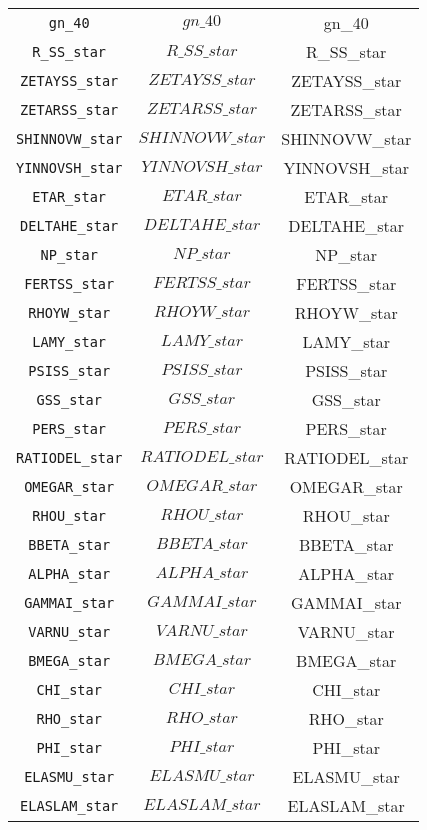 \begin{center}
\begin{longtable}{ccc}
\texttt{gn\_40} & $gn\_40$ & gn\_40\\
\texttt{R\_SS\_star} & $R\_SS\_star$ & R\_SS\_star\\
\texttt{ZETAYSS\_star} & $ZETAYSS\_star$ & ZETAYSS\_star\\
\texttt{ZETARSS\_star} & $ZETARSS\_star$ & ZETARSS\_star\\
\texttt{SHINNOVW\_star} & $SHINNOVW\_star$ & SHINNOVW\_star\\
\texttt{YINNOVSH\_star} & $YINNOVSH\_star$ & YINNOVSH\_star\\
\texttt{ETAR\_star} & $ETAR\_star$ & ETAR\_star\\
\texttt{DELTAHE\_star} & $DELTAHE\_star$ & DELTAHE\_star\\
\texttt{NP\_star} & $NP\_star$ & NP\_star\\
\texttt{FERTSS\_star} & $FERTSS\_star$ & FERTSS\_star\\
\texttt{RHOYW\_star} & $RHOYW\_star$ & RHOYW\_star\\
\texttt{LAMY\_star} & $LAMY\_star$ & LAMY\_star\\
\texttt{PSISS\_star} & $PSISS\_star$ & PSISS\_star\\
\texttt{GSS\_star} & $GSS\_star$ & GSS\_star\\
\texttt{PERS\_star} & $PERS\_star$ & PERS\_star\\
\texttt{RATIODEL\_star} & $RATIODEL\_star$ & RATIODEL\_star\\
\texttt{OMEGAR\_star} & $OMEGAR\_star$ & OMEGAR\_star\\
\texttt{RHOU\_star} & $RHOU\_star$ & RHOU\_star\\
\texttt{BBETA\_star} & $BBETA\_star$ & BBETA\_star\\
\texttt{ALPHA\_star} & $ALPHA\_star$ & ALPHA\_star\\
\texttt{GAMMAI\_star} & $GAMMAI\_star$ & GAMMAI\_star\\
\texttt{VARNU\_star} & $VARNU\_star$ & VARNU\_star\\
\texttt{BMEGA\_star} & $BMEGA\_star$ & BMEGA\_star\\
\texttt{CHI\_star} & $CHI\_star$ & CHI\_star\\
\texttt{RHO\_star} & $RHO\_star$ & RHO\_star\\
\texttt{PHI\_star} & $PHI\_star$ & PHI\_star\\
\texttt{ELASMU\_star} & $ELASMU\_star$ & ELASMU\_star\\
\texttt{ELASLAM\_star} & $ELASLAM\_star$ & ELASLAM\_star\\

\end{longtable}
\end{center}
